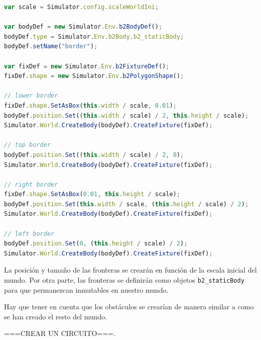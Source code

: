 \begin{lstlisting}[language={Javascript},label={code:creacion-fronteras}, caption={Función que crea las fronteras del mundo.}]
var scale = Simulator.config.scaleWorldIni;

var bodyDef = new Simulator.Env.b2BodyDef();
bodyDef.type = Simulator.Env.b2Body.b2_staticBody;
bodyDef.setName("border");

var fixDef = new Simulator.Env.b2FixtureDef();
fixDef.shape = new Simulator.Env.b2PolygonShape();

// lower border
fixDef.shape.SetAsBox(this.width / scale, 0.01);
bodyDef.position.Set((this.width / scale) / 2, this.height / scale);
Simulator.World.CreateBody(bodyDef).CreateFixture(fixDef);

// top border
bodyDef.position.Set((this.width / scale) / 2, 0);
Simulator.World.CreateBody(bodyDef).CreateFixture(fixDef);

// right border
fixDef.shape.SetAsBox(0.01, this.height / scale);
bodyDef.position.Set(this.width / scale, (this.height / scale) / 2);
Simulator.World.CreateBody(bodyDef).CreateFixture(fixDef);

// left border
bodyDef.position.Set(0, (this.height / scale) / 2);
Simulator.World.CreateBody(bodyDef).CreateFixture(fixDef);
\end{lstlisting}

La posición y tamaño de las fronteras se crearán en función de la escala inicial del mundo. Por otra parte, las fronteras se definirán como objetos \texttt{b2\_staticBody} para que permanezcan inmutables en nuestro mundo.

Hay que tener en cuenta que los obstáculos se crearían de manera similar a como se han creado el resto del mundo.

{\color{green} ===CREAR UN CIRCUITO===}.

